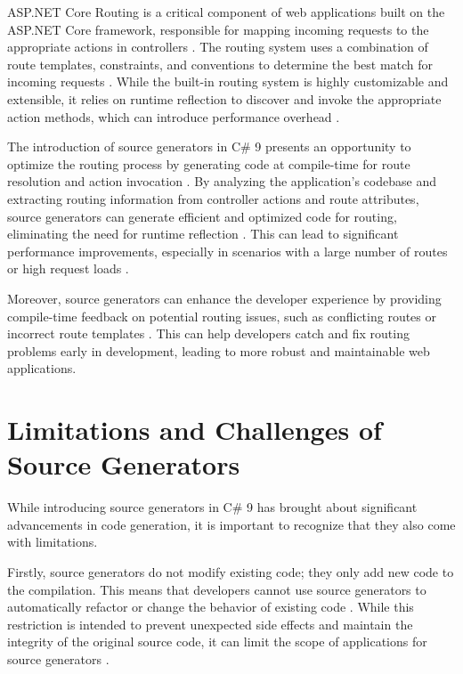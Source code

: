 ASP.NET Core Routing is a critical component of web applications built on the ASP.NET Core framework, responsible for mapping incoming requests to the appropriate actions in controllers \cite{Microsoft2023RoutingCore}. The routing system uses a combination of route templates, constraints, and conventions to determine the best match for incoming requests \cite{Microsoft2023RoutingCore}. While the built-in routing system is highly customizable and extensible, it relies on runtime reflection to discover and invoke the appropriate action methods, which can introduce performance overhead \cite{Microsoft2023RoutingCore}.

The introduction of source generators in C\# 9 presents an opportunity to optimize the routing process by generating code at compile-time for route resolution and action invocation \cite{CSharpRoslyn}. By analyzing the application's codebase and extracting routing information from controller actions and route attributes, source generators can generate efficient and optimized code for routing, eliminating the need for runtime reflection \cite{Carter2020}. This can lead to significant performance improvements, especially in scenarios with a large number of routes or high request loads \cite{Slimak2022}.

Moreover, source generators can enhance the developer experience by providing compile-time feedback on potential routing issues, such as conflicting routes or incorrect route templates \cite{CSharpRoslyn}. This can help developers catch and fix routing problems early in development, leading to more robust and maintainable web applications.

\section{Limitations and Challenges of Source Generators}

While introducing source generators in C\# 9 has brought about significant advancements in code generation, it is important to recognize that they also come with limitations.

Firstly, source generators do not modify existing code; they only add new code to the compilation. This means that developers cannot use source generators to automatically refactor or change the behavior of existing code \cite{CSharpRoslyn}. While this restriction is intended to prevent unexpected side effects and maintain the integrity of the original source code, it can limit the scope of applications for source generators \cite{Carter2020}.

